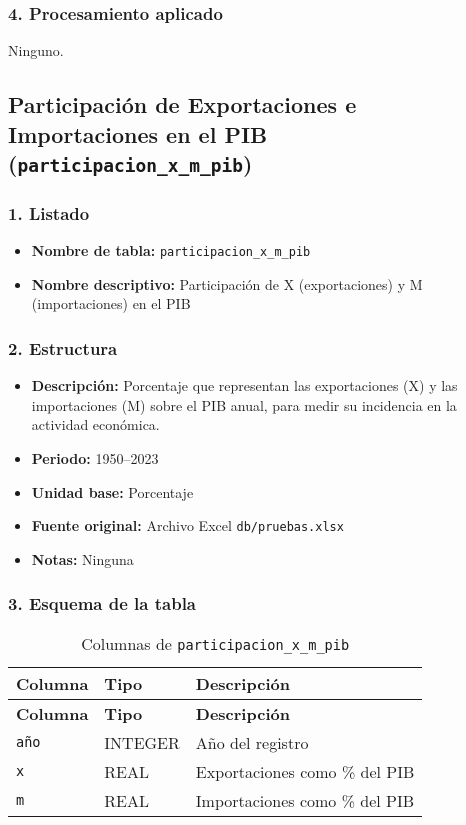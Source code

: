 \documentclass[12pt,a4paper]{article}
\begin{document}
\subsubsection*{4. Procesamiento aplicado}
Ninguno.

\newpage
\subsection{Participación de Exportaciones e Importaciones en el PIB (\texttt{participacion\_x\_m\_pib})}

\subsubsection*{1. Listado}
\begin{itemize}
  \item \textbf{Nombre de tabla:} \texttt{participacion\_x\_m\_pib}
  \item \textbf{Nombre descriptivo:} Participación de X (exportaciones) y M (importaciones) en el PIB
\end{itemize}

\subsubsection*{2. Estructura}
\begin{itemize}
  \item \textbf{Descripción:} Porcentaje que representan las exportaciones (X) y las importaciones (M) sobre el PIB anual, para medir su incidencia en la actividad económica.
  \item \textbf{Periodo:} 1950--2023
  \item \textbf{Unidad base:} Porcentaje
  \item \textbf{Fuente original:} Archivo Excel \texttt{db/pruebas.xlsx}
  \item \textbf{Notas:} Ninguna
\end{itemize}

\subsubsection*{3. Esquema de la tabla}
\begin{longtable}{@{}lll@{}}
\caption{Columnas de \texttt{participacion\_x\_m\_pib}}\\
\toprule
\textbf{Columna} & \textbf{Tipo} & \textbf{Descripción} \\
\midrule
\endfirsthead
\toprule
\textbf{Columna} & \textbf{Tipo} & \textbf{Descripción} \\
\midrule
\endhead
\bottomrule
\endfoot
\texttt{año} & INTEGER & Año del registro \\
\texttt{x}   & REAL    & Exportaciones como \% del PIB \\
\texttt{m}   & REAL    & Importaciones como \% del PIB \\
\end{longtable}
\end{document}
